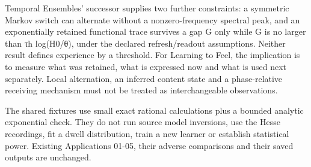 \documentclass[
  american,
  11pt,
  letterpaper,
]{article}
\begin{document}
Temporal Ensembles' successor supplies two further constraints: a symmetric Markov switch can alternate without a nonzero-frequency spectral peak, and an exponentially retained functional trace survives a gap G only while G is no larger than τh log(H0/θ), under the declared refresh/readout assumptions. Neither result defines experience by a threshold. For Learning to Feel, the implication is to measure what was retained, what is expressed now and what is used next separately. Local alternation, an inferred content state and a phase-relative receiving mechanism must not be treated as interchangeable observations.

The shared fixtures use small exact rational calculations plus a bounded analytic exponential check. They do not run source model inversions, use the Hesse recordings, fit a dwell distribution, train a new learner or establish statistical power. Existing Applications 01-05, their adverse comparisons and their saved outputs are unchanged.
\end{document}
